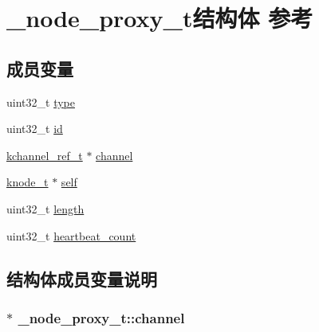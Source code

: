 \hypertarget{a00040}{}\section{\+\_\+node\+\_\+proxy\+\_\+t结构体 参考}
\label{a00040}
\subsection*{成员变量}
\begin{DoxyCompactItemize}
\item 
uint32\+\_\+t \hyperlink{a00040_a4535368a55e887db9cd48723457416f6_a4535368a55e887db9cd48723457416f6}{type}
\item 
uint32\+\_\+t \hyperlink{a00040_a56ff76512a6cfe92d51971ccdd7f88fa_a56ff76512a6cfe92d51971ccdd7f88fa}{id}
\item 
\hyperlink{a00066_a3b7e82599367eade261456f60ebe2cd9_a3b7e82599367eade261456f60ebe2cd9}{kchannel\+\_\+ref\+\_\+t} $\ast$ \hyperlink{a00040_a11ad107d649c94f042ef6b326f42d5c3_a11ad107d649c94f042ef6b326f42d5c3}{channel}
\item 
\hyperlink{a00066_a5e720b27efbc9ad744240f5f4233763a_a5e720b27efbc9ad744240f5f4233763a}{knode\+\_\+t} $\ast$ \hyperlink{a00040_a5793ea18f46f0d0cf0ce003904467c6f_a5793ea18f46f0d0cf0ce003904467c6f}{self}
\item 
uint32\+\_\+t \hyperlink{a00040_a9031cd4ac9c1b7afae561b1e3e13d84c_a9031cd4ac9c1b7afae561b1e3e13d84c}{length}
\item 
uint32\+\_\+t \hyperlink{a00040_a619c9d4da80b0712c2c72e8e84380ff4_a619c9d4da80b0712c2c72e8e84380ff4}{heartbeat\+\_\+count}
\end{DoxyCompactItemize}


\subsection{结构体成员变量说明}
\hypertarget{a00040_a11ad107d649c94f042ef6b326f42d5c3_a11ad107d649c94f042ef6b326f42d5c3}{}
\subsubsection[{channel}]{$\ast$ \+\_\+node\+\_\+proxy\+\_\+t\+::channel}\label{a00040_a11ad107d649c94f042ef6b326f42d5c3_a11ad107d649c94f042ef6b326f42d5c3}
\hypertarget{a00040_a619c9d4da80b0712c2c72e8e84380ff4_a619c9d4da80b0712c2c72e8e84380ff4}{}

